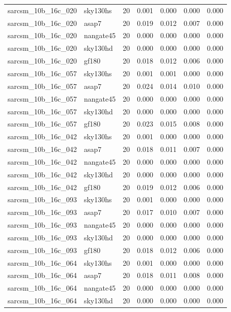 \begin{tabular}{llrrrrr}
sarcsm\_10b\_16c\_020 & sky130hs & 20 & 0.001 & 0.000 & 0.000 & 0.000 \\
sarcsm\_10b\_16c\_020 & asap7 & 20 & 0.019 & 0.012 & 0.007 & 0.000 \\
sarcsm\_10b\_16c\_020 & nangate45 & 20 & 0.000 & 0.000 & 0.000 & 0.000 \\
sarcsm\_10b\_16c\_020 & sky130hd & 20 & 0.000 & 0.000 & 0.000 & 0.000 \\
sarcsm\_10b\_16c\_020 & gf180 & 20 & 0.018 & 0.012 & 0.006 & 0.000 \\
sarcsm\_10b\_16c\_057 & sky130hs & 20 & 0.001 & 0.001 & 0.000 & 0.000 \\
sarcsm\_10b\_16c\_057 & asap7 & 20 & 0.024 & 0.014 & 0.010 & 0.000 \\
sarcsm\_10b\_16c\_057 & nangate45 & 20 & 0.000 & 0.000 & 0.000 & 0.000 \\
sarcsm\_10b\_16c\_057 & sky130hd & 20 & 0.000 & 0.000 & 0.000 & 0.000 \\
sarcsm\_10b\_16c\_057 & gf180 & 20 & 0.023 & 0.015 & 0.008 & 0.000 \\
sarcsm\_10b\_16c\_042 & sky130hs & 20 & 0.001 & 0.000 & 0.000 & 0.000 \\
sarcsm\_10b\_16c\_042 & asap7 & 20 & 0.018 & 0.011 & 0.007 & 0.000 \\
sarcsm\_10b\_16c\_042 & nangate45 & 20 & 0.000 & 0.000 & 0.000 & 0.000 \\
sarcsm\_10b\_16c\_042 & sky130hd & 20 & 0.000 & 0.000 & 0.000 & 0.000 \\
sarcsm\_10b\_16c\_042 & gf180 & 20 & 0.019 & 0.012 & 0.006 & 0.000 \\
sarcsm\_10b\_16c\_093 & sky130hs & 20 & 0.001 & 0.000 & 0.000 & 0.000 \\
sarcsm\_10b\_16c\_093 & asap7 & 20 & 0.017 & 0.010 & 0.007 & 0.000 \\
sarcsm\_10b\_16c\_093 & nangate45 & 20 & 0.000 & 0.000 & 0.000 & 0.000 \\
sarcsm\_10b\_16c\_093 & sky130hd & 20 & 0.000 & 0.000 & 0.000 & 0.000 \\
sarcsm\_10b\_16c\_093 & gf180 & 20 & 0.018 & 0.012 & 0.006 & 0.000 \\
sarcsm\_10b\_16c\_064 & sky130hs & 20 & 0.001 & 0.000 & 0.000 & 0.000 \\
sarcsm\_10b\_16c\_064 & asap7 & 20 & 0.018 & 0.011 & 0.008 & 0.000 \\
sarcsm\_10b\_16c\_064 & nangate45 & 20 & 0.000 & 0.000 & 0.000 & 0.000 \\
sarcsm\_10b\_16c\_064 & sky130hd & 20 & 0.000 & 0.000 & 0.000 & 0.000 \\

\end{tabular}
